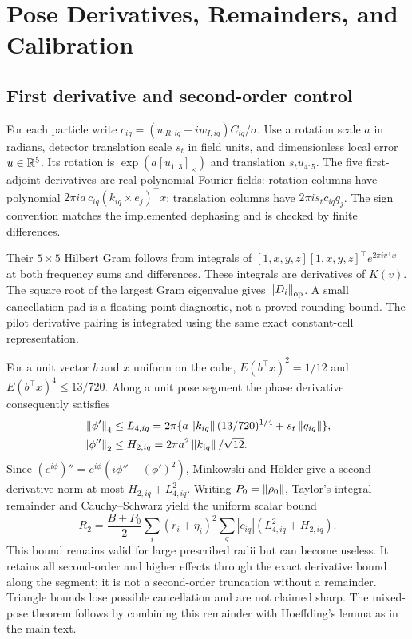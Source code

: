\section{Pose Derivatives, Remainders, and Calibration}\label{app:pose}
\subsection{First derivative and second-order control}
For each particle write $c_{iq}=(w_{R,iq}+iw_{I,iq})C_{iq}/\sigma$.
Use a rotation scale $a$ in radians, detector translation scale $s_t$ in
field units, and dimensionless local error $u\in\mathbb{R}^5$. Its rotation is
$\exp(a[u_{1:3}]_\times)$ and translation $s_tu_{4:5}$. The five
first-adjoint derivatives are real polynomial Fourier fields: rotation
columns have polynomial $2\pi i a\,c_{iq}(k_{iq}\times e_j)^\top x$;
translation columns have $2\pi i s_t c_{iq}q_j$. The sign convention
matches the implemented dephasing and is checked by finite differences.

Their $5\times5$ Hilbert Gram follows from integrals of
$[1,x,y,z][1,x,y,z]^\top e^{2\pi i v^\top x}$ at both frequency sums and
differences. These integrals are derivatives of $K(v)$. The square root
of the largest Gram eigenvalue gives $\left\|D_i\right\|_{\rm op}$. A small
cancellation pad is a floating-point diagnostic, not a proved rounding
bound. The pilot derivative pairing is integrated using the same exact
constant-cell representation.

For a unit vector $b$ and $x$ uniform on the cube,
$E(b^\top x)^2=1/12$ and $E(b^\top x)^4\le13/720$. Along a unit pose
segment the phase derivative consequently satisfies
\begin{align}
\left\|\phi'\right\|_4&\le L_{4,iq}
=2\pi\{a\left\|k_{iq}\right\|(13/720)^{1/4}+s_t\left\|q_{iq}\right\|\},\\
\left\|\phi''\right\|_2&\le H_{2,iq}=2\pi a^2\left\|k_{iq}\right\|/\sqrt{12}.
\end{align}
Since $(e^{i\phi})''=e^{i\phi}(i\phi''-(\phi')^2)$, Minkowski and
H\"older give a second derivative norm at most $H_{2,iq}+L_{4,iq}^2$.
Writing $P_0=\left\|\rho_0\right\|$, Taylor's integral remainder and
Cauchy--Schwarz yield the uniform scalar bound
\begin{equation}\label{eq:secondremainder}
R_2=\frac{B+P_0}{2}\sum_i (r_i+\eta_i)^2
\sum_q|c_{iq}|(L_{4,iq}^2+H_{2,iq}).
\end{equation}
This bound remains valid for large prescribed radii but can become useless.
It retains all second-order and higher effects through the exact derivative
bound along the segment; it is not a second-order truncation without a
remainder. Triangle bounds lose possible cancellation and are not claimed
sharp. The mixed-pose theorem follows by combining this remainder with
Hoeffding's lemma as in the main text.

